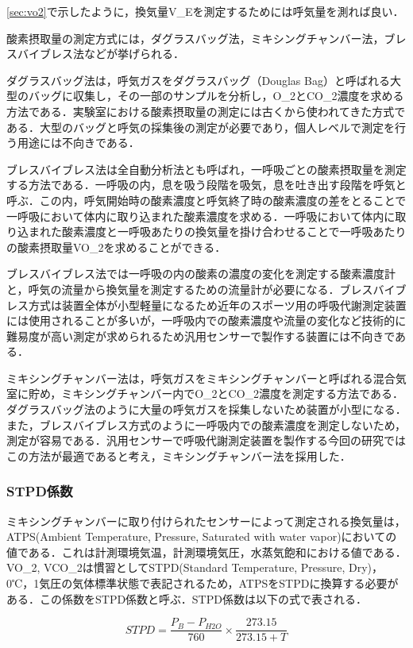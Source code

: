 \ref{sec:vo2}で示したように，換気量V_Eを測定するためには呼気量を測れば良い．

酸素摂取量の測定方式には，ダグラスバッグ法，ミキシングチャンバー法，ブレスバイブレス法などが挙げられる．

ダグラスバッグ法は，呼気ガスをダグラスバッグ（Douglas Bag）と呼ばれる大型のバッグに収集し，その一部のサンプルを分析し，O_2とCO_2濃度を求める方法である．実験室における酸素摂取量の測定には古くから使われてきた方式である．大型のバッグと呼気の採集後の測定が必要であり，個人レベルで測定を行う用途には不向きである．

ブレスバイブレス法は全自動分析法とも呼ばれ，一呼吸ごとの酸素摂取量を測定する方法である．一呼吸の内，息を吸う段階を吸気，息を吐き出す段階を呼気と呼ぶ．この内，呼気開始時の酸素濃度と呼気終了時の酸素濃度の差をとることで一呼吸において体内に取り込まれた酸素濃度を求める．一呼吸において体内に取り込まれた酸素濃度と一呼吸あたりの換気量を掛け合わせることで一呼吸あたりの酸素摂取量VO_2を求めることができる．

ブレスバイブレス法では一呼吸の内の酸素の濃度の変化を測定する酸素濃度計と，呼気の流量から換気量を測定するための流量計が必要になる．ブレスバイブレス方式は装置全体が小型軽量になるため近年のスポーツ用の呼吸代謝測定装置には使用されることが多いが，一呼吸内での酸素濃度や流量の変化など技術的に難易度が高い測定が求められるため汎用センサーで製作する装置には不向きである．

ミキシングチャンバー法は，呼気ガスをミキシングチャンバーと呼ばれる混合気室に貯め，ミキシングチャンバー内でO_2とCO_2濃度を測定する方法である．ダグラスバッグ法のように大量の呼気ガスを採集しないため装置が小型になる．また，ブレスバイブレス方式のように一呼吸内での酸素濃度を測定しないため，測定が容易である．汎用センサーで呼吸代謝測定装置を製作する今回の研究ではこの方法が最適であると考え，ミキシングチャンバー法を採用した．

\subsubsection{STPD係数}

ミキシングチャンバーに取り付けられたセンサーによって測定される換気量は，ATPS(Ambient Temperature, Pressure, Saturated with water vapor)においての値である．これは計測環境気温，計測環境気圧，水蒸気飽和における値である．VO_2, VCO_2は慣習としてSTPD(Standard Temperature, Pressure, Dry)，0℃，1気圧の気体標準状態で表記されるため，ATPSをSTPDに換算する必要がある．この係数をSTPD係数と呼ぶ．STPD係数は以下の式で表される．

\begin{equation}
  \label{eq:stpd}
  STPD = \frac{P_B - P_{H2O}}{760} \times　\frac{273.15}{273.15 + T}
\end{equation}

